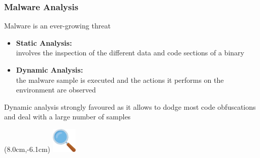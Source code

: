 \documentclass[compress]{beamer}
\begin{document}

\begin{frame}
    \frametitle{Malware Analysis}

	Malware is an ever-growing threat
	
    \medskip
    \begin{itemize}
        \item \textcolor{sapienza}{\textbf{Static Analysis:}}\\
        involves the inspection of the different data and code sections of a binary
        \item \textcolor{sapienza}{\textbf{Dynamic Analysis:}}\\
        the malware sample is executed and the actions it performs on the environment are observed
    \end{itemize}
    \vspace{0.5cm}    
        
         \begin{beamerboxesrounded}[shadow=true]{}
    Dynamic analysis strongly favoured as it allows to dodge most code obfuscations and deal with a large number of samples
    \end{beamerboxesrounded}    

    \begin{textblock*}{2cm}(8.0cm,-6.1cm)
   \includegraphics[width=1.2cm]{image/search.png}%
	\end{textblock*} 

\end{frame}
\end{document}
